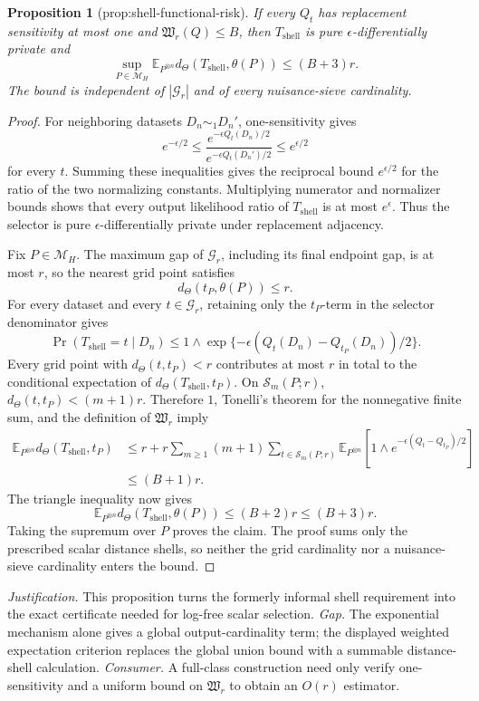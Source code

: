 \documentclass{article}
\newtheorem{proposition}{Proposition}
\begin{document}
\begin{proposition}[prop:shell-functional-risk]\label{prop:shell-functional-risk}
If every \(Q_t\) has replacement sensitivity at most one and \(\mathfrak W_r(Q)\le B\), then \(T_{\mathrm{shell}}\) is pure \(\epsilon\)-differentially private and \[\sup_{P\in\mathcal M_H}\mathbb E_{P^{\otimes n}}d_\Theta(T_{\mathrm{shell}},\theta(P))\le (B+3)r.\] The bound is independent of \(|\mathcal G_r|\) and of every nuisance-sieve cardinality.
\end{proposition}
\begin{proof}
For neighboring datasets \(D_n\sim_1D_n'\), one-sensitivity gives
\[
 e^{-\epsilon/2}
 \le\frac{e^{-\epsilon Q_t(D_n)/2}}{e^{-\epsilon Q_t(D_n')/2}}
 \le e^{\epsilon/2}
\]
for every \(t\).  Summing these inequalities gives the reciprocal bound \(e^{\epsilon/2}\) for the ratio of the two normalizing constants.  Multiplying numerator and normalizer bounds shows that every output likelihood ratio of \(T_{\mathrm{shell}}\) is at most \(e^\epsilon\).  Thus the selector is pure \(\epsilon\)-differentially private under replacement adjacency.

Fix \(P\in\mathcal M_H\).  The maximum gap of \(\mathcal G_r\), including its final endpoint gap, is at most \(r\), so the nearest grid point satisfies
\[
 d_\Theta(t_P,\theta(P))\le r.
\]
For every dataset and every \(t\in\mathcal G_r\), retaining only the \(t_P\)-term in the selector denominator gives
\[
 \Pr(T_{\mathrm{shell}}=t\mid D_n)
 \le 1\wedge
 \exp\{-\epsilon(Q_t(D_n)-Q_{t_P}(D_n))/2\}. \tag{1}
\]
Every grid point with \(d_\Theta(t,t_P)<r\) contributes at most \(r\) in total to the conditional expectation of \(d_\Theta(T_{\mathrm{shell}},t_P)\).  On \(\mathcal S_m(P;r)\), \(d_\Theta(t,t_P)<(m+1)r\).  Therefore \(1\), Tonelli's theorem for the nonnegative finite sum, and the definition of \(\mathfrak W_r\) imply
\[
 \begin{aligned}
 \mathbb E_{P^{\otimes n}}d_\Theta(T_{\mathrm{shell}},t_P)
 &\le r+r\sum_{m\ge1}(m+1)
 \sum_{t\in\mathcal S_m(P;r)}
 \mathbb E_{P^{\otimes n}}
 \left[1\wedge e^{-\epsilon(Q_t-Q_{t_P})/2}\right]\\
 &\le (B+1)r.
 \end{aligned}
\]
The triangle inequality now gives
\[
 \mathbb E_{P^{\otimes n}}d_\Theta(T_{\mathrm{shell}},\theta(P))
 \le(B+2)r\le(B+3)r.
\]
Taking the supremum over \(P\) proves the claim.  The proof sums only the prescribed scalar distance shells, so neither the grid cardinality nor a nuisance-sieve cardinality enters the bound.
\end{proof}
\par\smallskip\noindent \textit{Justification.} This proposition turns the formerly informal shell requirement into the exact certificate needed for log-free scalar selection. \textit{Gap.} The exponential mechanism alone gives a global output-cardinality term; the displayed weighted expectation criterion replaces the global union bound with a summable distance-shell calculation. \textit{Consumer.} A full-class construction need only verify one-sensitivity and a uniform bound on \(\mathfrak W_r\) to obtain an \(O(r)\) estimator.
\end{document}
